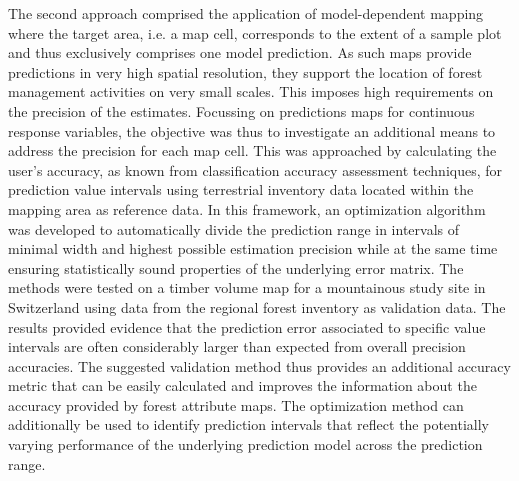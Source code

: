 The second approach comprised the application of model-dependent mapping where the target area, i.e. a map cell, corresponds to the extent of a sample plot and thus exclusively comprises one model prediction.
As such maps provide predictions in very high spatial resolution, they support the location of forest management activities on very small scales. This imposes high requirements on the precision of the estimates. Focussing on predictions maps for continuous response variables, the objective was thus to investigate an additional means to address the precision for each map cell. This was approached by calculating the user's accuracy, as known from classification accuracy assessment techniques, for prediction value intervals using terrestrial inventory data located within the mapping area as reference data. In this framework, an optimization algorithm was developed to automatically divide the prediction range in intervals of minimal width and highest possible estimation precision while at the same time ensuring statistically sound properties of the underlying error matrix. The methods were tested on a timber volume map for a mountainous study site in Switzerland using data from the regional forest inventory as validation data. The results provided evidence that the prediction error associated to specific value intervals are often considerably larger than expected from overall precision accuracies. The suggested validation method thus provides an additional accuracy metric that can be easily calculated and improves the information about the accuracy provided by forest attribute maps. The optimization method can additionally be used to identify prediction intervals that reflect the potentially varying performance of the underlying prediction model across the prediction range.